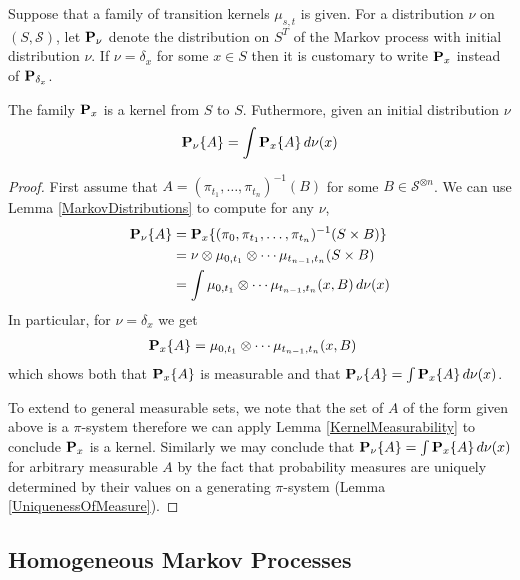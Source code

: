 \begin{defn}Suppose that a family of transition kernels $\mu_{s,t}$ is
  given.  For a distribution $\nu$ on $(S, \mathcal{S})$, let
  $\sprobabilityop{\nu}$ denote the distribution on $S^T$ of the
  Markov process with initial distribution $\nu$.  If $\nu=\delta_x$
  for some $x \in S$ then it is customary to write
  $\sprobabilityop{x}$ instead of $\sprobabilityop{\delta_x}$.
\end{defn}
\begin{lem}\label{MarkovMixtures}The family $\sprobabilityop{x}$ is a kernel from $S$ to
  $S$.  Futhermore, given an initial distribution $\nu$
\begin{align*}
\sprobability{A}{\nu} = \int \sprobability{A}{x} \, d\nu(x)
\end{align*}
\end{lem}
\begin{proof}
First assume that $A = (\pi_{t_1}, \dots, \pi_{t_n})^{-1}(B)$ for some
$B \in \mathcal{S}^{\otimes n}$.  We can use Lemma \ref{MarkovDistributions} to compute for
any $\nu$,
\begin{align*}
\sprobability{A}{\nu} &= \sprobability{(\pi_0, \pi_{t_1}, \dots,
  \pi_{t_n})^{-1}(S \times B)}{x} \\
&=\nu \otimes \mu_{0, t_1} \otimes \cdots \mu_{t_{n-1}, t_n}(S \times
B) \\
&= \int \mu_{0, t_1} \otimes \cdots \mu_{t_{n-1}, t_n}(x,B) \, d\nu(x)
\end{align*}
In particular, for $\nu = \delta_x$ we get
\begin{align*}
\sprobability{A}{x} &=\mu_{0, t_1} \otimes \cdots \mu_{t_{n-1},
  t_n}(x,B)
\end{align*}
which shows both that $\sprobability{A}{x}$ is measurable and that
$\sprobability{A}{\nu} = \int \sprobability{A}{x} \, d\nu(x)$.

To extend to general measurable sets, we note that the set of $A$ of
the form given above is a $\pi$-system therefore we can apply Lemma
\ref{KernelMeasurability} to conclude $\sprobabilityop{x}$ is a
kernel.  Similarly we may conclude that $\sprobability{A}{\nu} = \int
\sprobability{A}{x} \, d\nu(x)$ for arbitrary measurable $A$ by the fact that probability measures
are uniquely determined by their values on a generating $\pi$-system
(Lemma \ref{UniquenessOfMeasure}).
\end{proof}

\subsection{Homogeneous Markov Processes}

